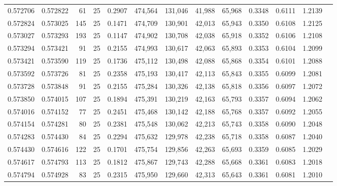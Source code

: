 \begin{tabular}{rrrrrrrrrrrrr}
0.572706 & 0.572822 &    61 &  25 &                                     0.2907 & 474,564 & 131,046 &  41,988 &  65,968 & 0.3348 & 0.6111 & 1.2139 \\
0.572824 & 0.573025 &   145 &  25 &                                     0.1471 & 474,709 & 130,901 &  42,013 &  65,943 & 0.3350 & 0.6108 & 1.2125 \\
0.573027 & 0.573293 &   193 &  25 &                                     0.1147 & 474,902 & 130,708 &  42,038 &  65,918 & 0.3352 & 0.6106 & 1.2108 \\
0.573294 & 0.573421 &    91 &  25 &                                     0.2155 & 474,993 & 130,617 &  42,063 &  65,893 & 0.3353 & 0.6104 & 1.2099 \\
0.573421 & 0.573590 &   119 &  25 &                                     0.1736 & 475,112 & 130,498 &  42,088 &  65,868 & 0.3354 & 0.6101 & 1.2088 \\
0.573592 & 0.573726 &    81 &  25 &                                     0.2358 & 475,193 & 130,417 &  42,113 &  65,843 & 0.3355 & 0.6099 & 1.2081 \\
0.573728 & 0.573848 &    91 &  25 &                                     0.2155 & 475,284 & 130,326 &  42,138 &  65,818 & 0.3356 & 0.6097 & 1.2072 \\
0.573850 & 0.574015 &   107 &  25 &                                     0.1894 & 475,391 & 130,219 &  42,163 &  65,793 & 0.3357 & 0.6094 & 1.2062 \\
0.574016 & 0.574152 &    77 &  25 &                                     0.2451 & 475,468 & 130,142 &  42,188 &  65,768 & 0.3357 & 0.6092 & 1.2055 \\
0.574154 & 0.574281 &    80 &  25 &                                     0.2381 & 475,548 & 130,062 &  42,213 &  65,743 & 0.3358 & 0.6090 & 1.2048 \\
0.574283 & 0.574430 &    84 &  25 &                                     0.2294 & 475,632 & 129,978 &  42,238 &  65,718 & 0.3358 & 0.6087 & 1.2040 \\
0.574430 & 0.574616 &   122 &  25 &                                     0.1701 & 475,754 & 129,856 &  42,263 &  65,693 & 0.3359 & 0.6085 & 1.2029 \\
0.574617 & 0.574793 &   113 &  25 &                                     0.1812 & 475,867 & 129,743 &  42,288 &  65,668 & 0.3361 & 0.6083 & 1.2018 \\
0.574794 & 0.574928 &    83 &  25 &                                     0.2315 & 475,950 & 129,660 &  42,313 &  65,643 & 0.3361 & 0.6081 & 1.2010 \\

\end{tabular}
